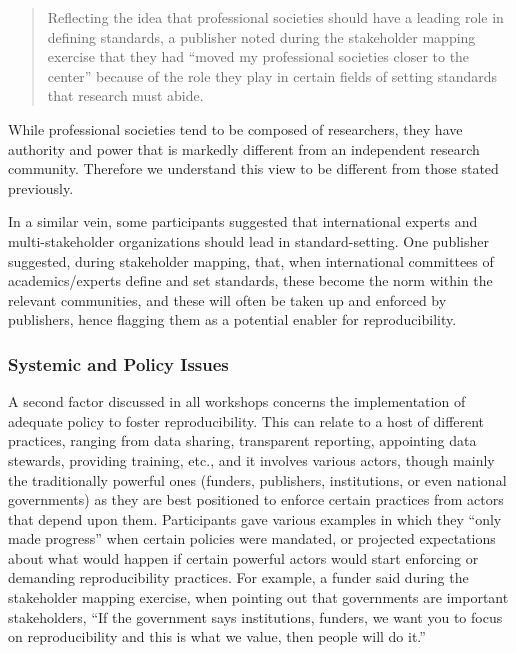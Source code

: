 \documentclass[authordate, meta]{jote-new-article}
\begin{document}
	\begin{quote}Reflecting the idea that professional societies should have a leading role in defining standards, a publisher noted during the stakeholder mapping exercise that they had “moved my professional societies closer to the center” because of the role they play in certain fields of setting standards that research must abide.\end{quote}



	While professional societies tend to be composed of researchers, they have authority and power that is markedly different from an independent research community. Therefore we understand this view to be different from those stated previously.



	In a similar vein, some participants suggested that international experts and multi-stakeholder organizations should lead in standard-setting. One publisher suggested, during stakeholder mapping, that, when international committees of academics/experts define and set standards, these become the norm within the relevant communities, and these will often be taken up and enforced by publishers, hence flagging them as a potential enabler for reproducibility.



	\subsubsection{Systemic and Policy Issues}



	A second factor discussed in all workshops concerns the implementation of adequate policy to foster reproducibility. This can relate to a host of different practices, ranging from data sharing, transparent reporting, appointing data stewards, providing training, etc., and it involves various actors, though mainly the traditionally powerful ones (funders, publishers, institutions, or even national governments) as they are best positioned to enforce certain practices from actors that depend upon them.  Participants gave various examples in which they “only made progress” when certain policies were mandated, or projected expectations about what would happen if certain powerful actors would start enforcing or demanding reproducibility practices. For example, a funder said during the stakeholder mapping exercise, when pointing out that governments are important stakeholders, “If the government says institutions, funders, we want you to focus on reproducibility and this is what we value, then people will do it.”
\end{document}
